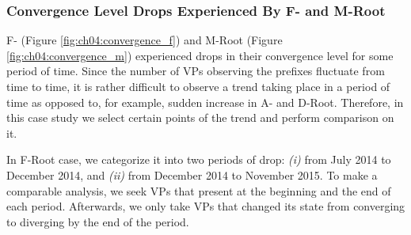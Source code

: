 \subsubsection{Convergence Level Drops Experienced By F- and M-Root}
F- (Figure \ref{fig:ch04:convergence_f}) and M-Root (Figure \ref{fig:ch04:convergence_m}) experienced drops in their convergence level for some period of time. Since the number of VPs observing the prefixes fluctuate from time to time, it is rather difficult to observe a trend taking place in a period of time as opposed to, for example, sudden increase in A- and D-Root. Therefore, in this case study we select certain points of the trend and perform comparison on it. 

In F-Root case, we categorize it into two periods of drop: \textit{(i)} from July 2014 to December 2014, and \textit{(ii)} from December 2014 to November 2015. To make a comparable analysis, we seek VPs that present at the beginning and the end of each period. Afterwards, we only take VPs that changed its state from converging to diverging by the end of the period.

